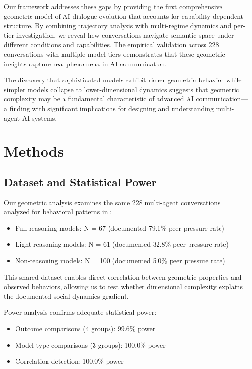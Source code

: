 \documentclass[11pt,letterpaper]{article}
\newcommand{\totalConversations}{228}
\newcommand{\fullReasoningCount}{67}
\newcommand{\lightReasoningCount}{61}
\newcommand{\nonReasoningCount}{100}
\newcommand{\powerOutcomeGroups}{99.6\%}
\newcommand{\powerModelTypes}{100.0\%}
\newcommand{\powerCorrelation}{100.0\%}
\newcommand{\fullReasoningPeerPressure}{79.1\%}
\newcommand{\lightReasoningPeerPressure}{32.8\%}
\newcommand{\nonReasoningPeerPressure}{5.0\%}
\begin{document}
Our framework addresses these gaps by providing the first comprehensive geometric model of AI dialogue evolution that accounts for capability-dependent structure. By combining trajectory analysis with multi-regime dynamics and per-tier investigation, we reveal how conversations navigate semantic space under different conditions and capabilities. The empirical validation across \totalConversations{} conversations with multiple model tiers demonstrates that these geometric insights capture real phenomena in AI communication.

The discovery that sophisticated models exhibit richer geometric behavior while simpler models collapse to lower-dimensional dynamics suggests that geometric complexity may be a fundamental characteristic of advanced AI communication—a finding with significant implications for designing and understanding multi-agent AI systems.

\section{Methods}

\subsection{Dataset and Statistical Power}

Our geometric analysis examines the same \totalConversations{} multi-agent conversations analyzed for behavioral patterns in \citep{garcia2025peer}:
\begin{itemize}
    \item Full reasoning models: N = \fullReasoningCount{} (documented \fullReasoningPeerPressure{} peer pressure rate)
    \item Light reasoning models: N = \lightReasoningCount{} (documented \lightReasoningPeerPressure{} peer pressure rate)
    \item Non-reasoning models: N = \nonReasoningCount{} (documented \nonReasoningPeerPressure{} peer pressure rate)
\end{itemize}

This shared dataset enables direct correlation between geometric properties and observed behaviors, allowing us to test whether dimensional complexity explains the documented social dynamics gradient.

Power analysis confirms adequate statistical power:
\begin{itemize}
    \item Outcome comparisons (4 groups): \powerOutcomeGroups{} power
    \item Model type comparisons (3 groups): \powerModelTypes{} power
    \item Correlation detection: \powerCorrelation{} power
\end{itemize}
\end{document}
